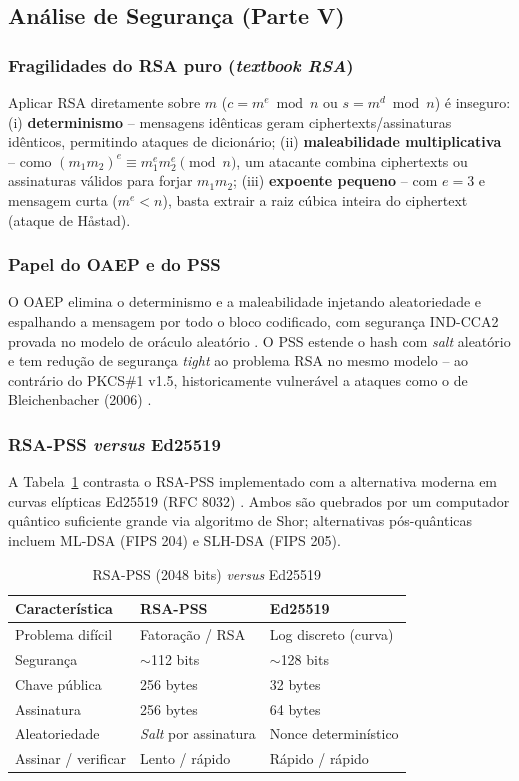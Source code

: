 \documentclass[conference]{IEEEtran}
\begin{document}
\subsection{Análise de Segurança (Parte V)}

\subsubsection{Fragilidades do RSA puro (\textit{textbook RSA})}
Aplicar RSA diretamente sobre $m$ ($c=m^e \bmod n$ ou $s=m^d \bmod n$) é
inseguro: (i) \textbf{determinismo} -- mensagens idênticas geram
ciphertexts/assinaturas idênticos, permitindo ataques de dicionário; (ii)
\textbf{maleabilidade multiplicativa} -- como
$(m_1 m_2)^e \equiv m_1^e m_2^e \pmod n$, um atacante combina ciphertexts
ou assinaturas válidos para forjar $m_1 m_2$; (iii) \textbf{expoente
pequeno} -- com $e=3$ e mensagem curta ($m^e < n$), basta extrair a raiz
cúbica inteira do ciphertext (ataque de Håstad).

\subsubsection{Papel do OAEP e do PSS}
O OAEP elimina o determinismo e a maleabilidade injetando aleatoriedade e
espalhando a mensagem por todo o bloco codificado, com segurança IND-CCA2
provada no modelo de oráculo aleatório \cite{br94}. O PSS
estende o hash com \textit{salt} aleatório e tem redução de segurança
\textit{tight} ao problema RSA no mesmo modelo \cite{br96} -- ao contrário do PKCS\#1
v1.5, historicamente vulnerável a ataques como o de Bleichenbacher (2006)
\cite{rfc8017}.

\subsubsection{RSA-PSS \textit{versus} Ed25519}
A Tabela~\ref{tab:comparativo} contrasta o RSA-PSS implementado com a
alternativa moderna em curvas elípticas Ed25519 (RFC 8032)
\cite{rfc8032}. Ambos são quebrados por um computador quântico suficiente
grande via algoritmo de Shor; alternativas pós-quânticas incluem ML-DSA
(FIPS 204) e SLH-DSA (FIPS 205).

\begin{table}[!t]
\caption{RSA-PSS (2048 bits) \textit{versus} Ed25519}
\label{tab:comparativo}
\centering
\small
\begin{tabular}{l p{2.9cm} p{2.9cm}}
\toprule
\textbf{Característica} & \textbf{RSA-PSS} & \textbf{Ed25519} \\
\midrule
Problema difícil & Fatoração / RSA & Log discreto (curva) \\
Segurança & $\sim$112 bits & $\sim$128 bits \\
Chave pública & 256 bytes & 32 bytes \\
Assinatura & 256 bytes & 64 bytes \\
Aleatoriedade & \textit{Salt} por assinatura & Nonce determinístico \\
Assinar / verificar & Lento / rápido & Rápido / rápido \\
\bottomrule
\end{tabular}
\end{table}
\end{document}
